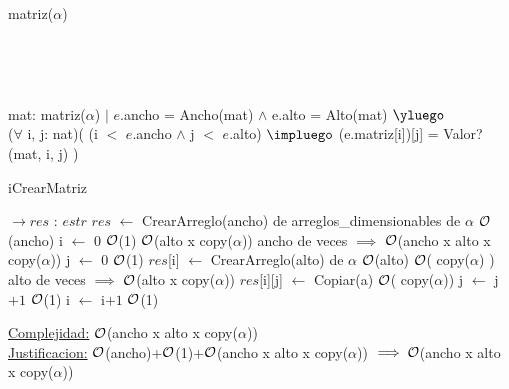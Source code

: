 \begin{Representacion}
	
	
	\begin{Estructura}{matriz($\alpha$)}
		 \begin{Tupla}[estr]
			\\
			
		\end{Tupla}
	\end{Estructura}
	
	
	~	
	
	{mat: matriz($\alpha$) $|$ $e$.ancho = Ancho(mat) $\land$ e.alto = Alto(mat) $\yluego$\\
	($\forall$ i, j: nat)( (i $<$ $e$.ancho $\land$ j $<$ $e$.alto) $\impluego$ (e.matriz[i])[j] = Valor?(mat, i, j) )}
	
\begin{Algoritmos}
	
	\begin{algorithm}[H]
		\caption{iCrearMatriz}
		
		\begin{algorithmic}[1]
			 $\to res$ : $estr$
			\State $res$ $\leftarrow$ CrearArreglo(ancho) de arreglos\_dimensionables de $\alpha$ \Comment $\mathcal{O}$(ancho)
			\State i $\leftarrow$ $0$ \Comment $\mathcal{O}$(1)
			 \Comment $\mathcal{O}$(alto x copy($\alpha$)) ancho de veces $\implies$ $\mathcal{O}$(ancho x alto x copy($\alpha$))
				\State j $\leftarrow$ $0$ \Comment $\mathcal{O}$(1)
				\State $res$[i] $\leftarrow$ CrearArreglo(alto) de $\alpha$ \Comment $\mathcal{O}$(alto)
				 \Comment $\mathcal{O}$( copy($\alpha$) ) alto de veces $\implies$  $\mathcal{O}$(alto x copy($\alpha$))
					\State $res$[i][j] $\leftarrow$ Copiar(a) \Comment $\mathcal{O}$( copy($\alpha$))
					\State j $\leftarrow$ j$+1$ \Comment $\mathcal{O}$(1)
				\EndWhile
				\State i $\leftarrow$ i$+1$ \Comment $\mathcal{O}$(1)
			\EndWhile
			\EndProcedure
		\end{algorithmic}
		\underline{Complejidad:} $\mathcal{O}$(ancho x alto x copy($\alpha$))
		\\
		\underline{Justificacion:} $\mathcal{O}$(ancho)+$\mathcal{O}$(1)+$\mathcal{O}$(ancho x alto x copy($\alpha$)) $\implies \mathcal{O}$(ancho x alto x copy($\alpha$))
		

\end{algorithm}
\end{Algoritmos}
\end{Representacion}
